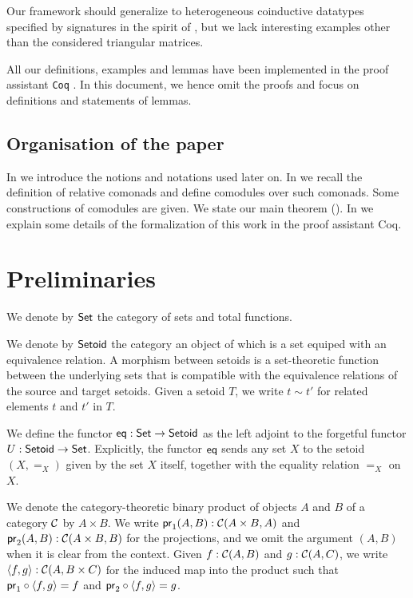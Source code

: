 \documentclass{amsart}
\begin{document}
 Our framework should generalize to heterogeneous coinductive datatypes specified by signatures in the spirit of \parencite{ahrens_relmonads},
 but we lack interesting examples other than the considered triangular matrices.
 
 All our definitions, examples and lemmas have been implemented in the proof assistant \texttt{Coq} \parencite{coq84pl3}.
 In this document, we hence omit the proofs and focus on definitions and statements of lemmas.
 
\subsection*{Organisation of the paper}
  In  we introduce the notions and notations used later on.
  In  we recall the definition of relative comonads and define comodules over such comonads.
  Some constructions of comodules are given.
  We state our main theorem ().
  In  we explain some details of the formalization of this work in the proof assistant \textsf{Coq}.
 
\section{Preliminaries}\label{sec:preliminaries}


\begin{definition}\label{def:set_setoid}
 We denote by $\Set$ the category of sets and total functions. 
 
 We denote by $\Setoid$ the category an object of which is a set equiped with an equivalence relation.
 A morphism between setoids is a set-theoretic function between the underlying sets that is compatible with the equivalence relations of the source and target setoids.
 Given a setoid $T$, we write $t\sim t'$ for related elements $t$ and $t'$ in $T$.
\end{definition}



\begin{definition}\label{def:eq}
 We define the functor $\eq : \Set\to\Setoid$ as the left adjoint to the forgetful functor 
  $U : \Setoid \to \Set$.
  Explicitly, the functor $\eq$ sends any set $X$ to the setoid $(X,=_X)$ given by the set $X$ itself, together
  with the equality relation $=_X$ on $X$.
\end{definition}


\begin{remark}
  We denote the category-theoretic binary product of objects $A$ and $B$ of a category $\C$ by $A\times B$.
  We write $\pr_1(A,B) : \C(A\times B, A)$ and $\pr_2(A,B) :\C(A\times B, B)$ for the projections, and we omit the 
  argument $(A,B)$ when it is clear from the context.
  Given $f : \C(A, B)$ and $g : \C(A,C)$, we write $\langle f,g\rangle : \C(A,B\times C)$ for the induced map into the product such that
  $\comp{\langle f,g\rangle}{\pr_1} = f$ and $\comp{\langle f,g\rangle}{\pr_2} = g$.
\end{remark}
\end{document}
